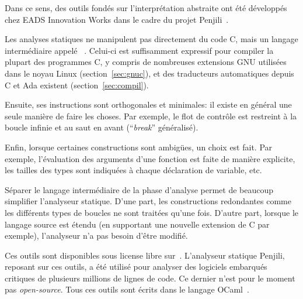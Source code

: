 


Dans ce sens, des outils fondés sur l'interprétation abstraite ont été
développés chez EADS Innovation Works dans le cadre du projet
Penjili~\cite{AllamigeonHymansSSTIC07}.

Les analyses statiques ne manipulent pas directement du code C, mais un langage
intermédiaire appelé \newspeak~\cite{newspeak}. Celui-ci est suffisamment
expressif pour compiler la plupart des programmes C, y compris de nombreuses
extensions GNU utilisées dans le noyau Linux (section~\ref{sec:gnuc}), et des
traducteurs automatiques depuis C et Ada existent (section~\ref{sec:compil}).

Ensuite, ses instructions sont orthogonales et minimales: il existe en général
une seule manière de faire les choses. Par exemple, le flot de contrôle est
restreint à la boucle infinie et au saut en avant (\enquote{\emph{break}}
généralisé).

Enfin, lorsque certaines constructions sont ambigües, un choix est fait. Par
exemple, l'évaluation des arguments d'une fonction est faite de manière
explicite, les tailles des types sont indiquées à chaque déclaration de
variable, etc.

Séparer le langage intermédiaire de la phase d'analyse permet de beaucoup
simplifier l'analyseur statique. D'une part, les constructions redondantes comme
les différents types de boucles ne sont traitées qu'une fois. D'autre part,
lorsque le langage source est étendu (en supportant une nouvelle extension de C
par exemple), l'analyseur n'a pas besoin d'être modifié.

Ces outils sont disponibles sous license libre sur~. L'analyseur
statique Penjili, reposant sur ces outils, a été utilisé pour analyser des
logiciels embarqués critiques de plusieurs millions de lignes de code. Ce
dernier n'est pour le moment pas \emph{open-source}. Tous ces outils sont écrits
dans le langage OCaml~\cite{DAOC}.


